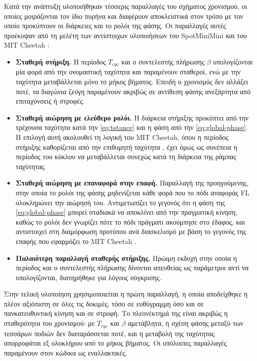 \documentclass[11pt]{report}
\begin{document}
Κατά την ανάπτυξη υλοποιήθηκαν τέσσερις παραλλαγές του σχήματος χρονισμού, οι
οποίες μοιράζονται τον ίδιο πυρήνα και διαφέρουν αποκλειστικά στον τρόπο με τον
οποίο προκύπτουν οι διάρκειες και το ρολόι της φάσης. Οι παραλλαγές αυτές
προέκυψαν από τη μελέτη των αντίστοιχων υλοποιήσεων του SpotMiniMini
\cite{spotminimini2020github} και του MIT Cheetah \cite{hyun_high_2014}:

\begin{itemize}
  \item \textbf{Σταθερή στήριξη.} Η περίοδος $T_{cyc}$ και ο συντελεστής
  πλήρωσης $\beta$ υπολογίζονται μία φορά από την ονομαστική ταχύτητα και
  παραμένουν σταθεροί, ενώ με την ταχύτητα μεταβάλλεται μόνο το μήκος βήματος.
  Επειδή ο χρονισμός δεν αλλάζει ποτέ, τα διαγώνια ζεύγη παραμένουν ακριβώς σε
  αντίθεση φάσης ανεξάρτητα από επιταχύνσεις ή στροφές.
  \item \textbf{Σταθερή αιώρηση με ελεύθερο ρολόι.} Η διάρκεια στήριξης
  προκύπτει από την τρέχουσα ταχύτητα κατά την \eqref{eq:tstance} και η φάση
  από την \eqref{eq:global-phase}. Η επιλογή αυτή ακολουθεί τη λογική του MIT
  Cheetah, όπου η περίοδος στήριξης καθορίζεται από την επιθυμητή ταχύτητα
  \cite{hyun_high_2014}, έχει όμως ως συνέπεια η περίοδος του κύκλου να
  μεταβάλλεται συνεχώς κατά τη διάρκεια της ράμπας ταχύτητας.
  \item \textbf{Σταθερή αιώρηση με επαναφορά στην επαφή.} Παραλλαγή της
  προηγούμενης, στην οποία το ρολόι της φάσης μηδενίζεται κάθε φορά που το πόδι
  αναφοράς FL ολοκληρώνει την αιώρησή του. Αντιμετωπίζει το γεγονός ότι η φάση
  της \eqref{eq:global-phase} μπορεί σταδιακά να αποκλίνει από την πραγματική
  κίνηση, καθώς το ρολόι δεν γνωρίζει πότε το πόδι πράγματι ακούμπησε στο
  έδαφος, και αντιστοιχεί στη διαμόρφωση προτύπου ανά διασκελισμό με βάση το
  γεγονός της επαφής που εφαρμόζει το MIT Cheetah \cite{hyun_high_2014}.
  \item \textbf{Παλαιότερη παραλλαγή σταθερής στήριξης.} Πρώιμη εκδοχή στην
  οποία η περίοδος και ο συντελεστής πλήρωσης δίνονται απευθείας ως παράμετροι
  αντί να υπολογίζονται, διατηρήθηκε για λόγους σύγκρισης.
\end{itemize}

Στην τελική υλοποίηση χρησιμοποιείται η πρώτη παραλλαγή, η οποία αποδείχθηκε η
πλέον αξιόπιστη σε όλες τις δοκιμές, τόσο σε ευθύγραμμη όσο και σε
πανκατευθυντική κίνηση και σε στροφή. Το πλεονέκτημά της είναι ακριβώς η
σταθερότητα του χρονισμού: με $T_{cyc}$ και $\beta$ αμετάβλητα, η σχέση φάσης
μεταξύ των τεσσάρων ποδιών δεν διαταράσσεται ποτέ, και η μεταβολή της ταχύτητας
απορροφάται εξ ολοκλήρου από το μήκος βήματος. Οι υπόλοιπες παραλλαγές
παραμένουν στον κώδικα ως εναλλακτικές.
\end{document}
